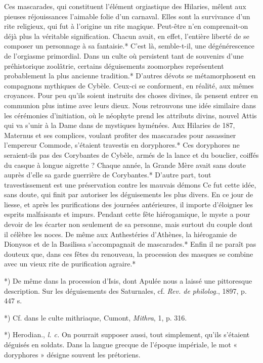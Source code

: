 \documentclass[a4paper, 11pt, oneside, polutonikogreek, french]{article}
\begin{document}
Ces mascarades, qui constituent l'élément orgiastique des Hilaries, mêlent aux pieuses réjouissances l'aimable folie d'un carnaval. Elles sont la survivance d'un rite religieux, qui fut à l'origine un rite magique. Peut-être n'en comprenait-on déjà plus la véritable signification. Chacun avait, en effet, l'entière liberté de se composer un personnage à sa fantaisie.* C'est là, semble-t-il, une dégénérescence de l'orgiasme primordial. Dans un culte où persistent tant de souvenirs d'une préhistorique zoolâtrie, certains déguisements zoomorphes représentent probablement la plus ancienne tradition.* D'autres dévots se métamorphosent en compagnons mythiques de Cybèle. Ceux-ci se conforment, en réalité, aux mêmes croyances. Pour peu qu'ils soient instruits des choses divines, ils pensent entrer en communion plus intime avec leurs dieux. Nous retrouvons une idée similaire dans les cérémonies d'initiation, où le néophyte prend les attributs divins, nouvel Attis qui va s'unir à la Dame dans de mystiques hyménées. Aux Hilaries de 187, Maternus et ses complices, voulant profiter des mascarades pour assassiner l'empereur Commode, s'étaient travestis en doryphores.* Ces doryphores ne seraient-ils pas des Corybantes de Cybèle, armés de la lance et du bouclier, coiffés du casque à longue aigrette ? Chaque année, la Grande Mère avait sans doute auprès d'elle sa garde guerrière de Corybantes.* D'autre part, tout travestissement est une préservation contre les mauvais démons Ce fut cette idée, sans doute, qui finit par autoriser les déguisements les plus divers. En ce jour de liesse, et après les purifications des journées antérieures, il importe d'éloigner les esprits malfaisants et impurs. Pendant cette fête hiérogamique, le myste a pour devoir de les écarter non seulement de sa personne, mais surtout du couple dont il célèbre les noces. De même aux Anthestéries d'Athènes, la hiérogamie de Dionysos et de la Basilissa s'accompagnait de mascarades.* Enfin il ne paraît pas douteux que, dans ces fêtes du renouveau, la procession des masques se combine avec un vieux rite de purification agraire.*

*) De même dans la procession d'Isis, dont Apulée nous a laissé une pittoresque description. Sur les déguisements des Saturnales, cf. \emph{Rev. de philolog.}, 1897, p. 447 s.

*) Cf. dans le culte mithriaque, Cumont, \emph{Mithra}, 1, p. 316.

*) Herodian., \emph{l. c.} On pourrait supposer aussi, tout simplement, qu'ils s'étaient déguisés en soldats. Dans la langue grecque de l'époque impériale, le mot « doryphores » désigne souvent les prétoriens.
\end{document}
